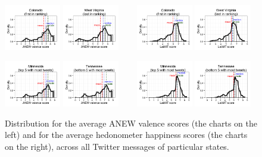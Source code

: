 \documentclass{acm_proc_article-sp}
\begin{document}
\begin{figure}[t!]
\centering
\includegraphics[width=0.22\textwidth]{tweets_distribution_anew_colorado}
\includegraphics[width=0.22\textwidth]{tweets_distribution_anew_west_virginia}
~~~
\includegraphics[width=0.22\textwidth]{tweets_distribution_hedonometer_colorado}
\includegraphics[width=0.22\textwidth]{tweets_distribution_hedonometer_west_virginia}

\includegraphics[width=0.22\textwidth]{tweets_distribution_anew_minnesota}
\includegraphics[width=0.22\textwidth]{tweets_distribution_anew_tennessee}
~~~
\includegraphics[width=0.22\textwidth]{tweets_distribution_hedonometer_minnesota}
\includegraphics[width=0.22\textwidth]{tweets_distribution_hedonometer_tennessee}
\caption{Distribution for the average ANEW valence scores (the charts on the left) and for the average hedonometer happiness scores (the charts on the right), across all Twitter messages of particular states.}
\label{f1}
\end{figure}
\end{document}

